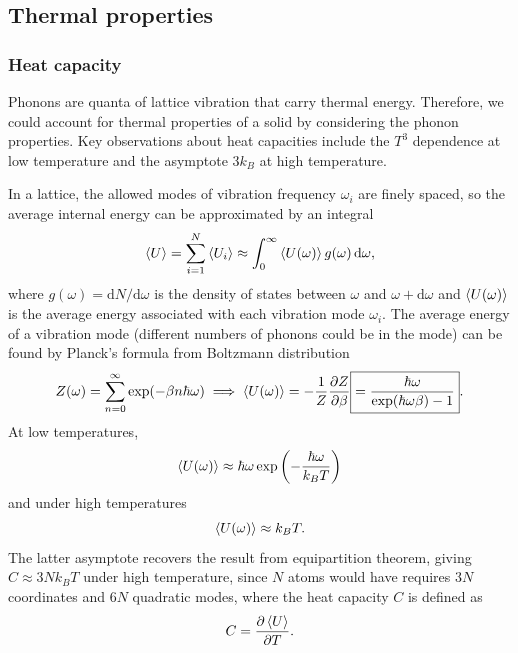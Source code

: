 \documentclass{article}
\theoremstyle{nonumberplain}
\begin{document}
\subsection{Thermal properties}
\subsubsection{Heat capacity}
Phonons are quanta of lattice vibration that carry thermal energy. Therefore, we could account for thermal properties of a solid by considering the phonon properties. Key observations about heat capacities include the $T^3$ dependence at low temperature and the asymptote $3 k_B$ at high temperature. 

In a lattice, the allowed modes of vibration frequency $\omega_i$ are finely spaced, so the average internal energy can be approximated by an integral
\[
    \expval{U} = \sum_{i=1}^{N} \expval{U_i} \approx \int_{0}^{\infty} \expval{U(\omega)} g(\omega) \,\mathrm{d}\omega, 
\]
where $g(\omega) = \mathrm{d} N / \mathrm{d} \omega $ is the density of states between $\omega$ and $\omega + \mathrm{d} \omega$ and $\expval{U(\omega)}$ is the average energy associated with each vibration mode $\omega_i$. The average energy of a vibration mode (different numbers of phonons could be in the mode) can be found by Planck's formula from Boltzmann distribution
\[
    Z(\omega ) = \sum_{n=0}^{\infty}  \exp(-\beta n \hbar \omega) \implies  \expval{U(\omega )} = -\frac{1}{Z }\frac{\partial Z}{\partial \beta } \boxed{= \frac{\hbar \omega}{\exp(\hbar \omega \beta ) - 1}}. 
\]
At low temperatures, 
\[
    \expval{U(\omega )} \approx \hbar \omega \exp \left( -\frac{\hbar \omega }{k_B T}\right)
\]
and under high temperatures
\[
    \expval{U(\omega )} \approx k_B T.
\]
The latter asymptote recovers the result from equipartition theorem, giving $C \approx 3 N k_B T$ under high temperature, since $N$ atoms would have requires $3N$ coordinates and $6N$ quadratic modes, where the heat capacity $C$ is defined as
\[
    C = \frac{\partial \expval{U}}{\partial T}. 
\] 
\end{document}
